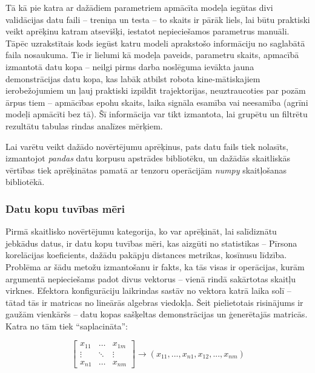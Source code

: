 \documentclass[12pt, a4paper]{article}
\numberwithin{equation}{section} %
\begin{document}
Tā kā pie katra ar dažādiem parametriem apmācīta modeļa iegūtas divi validācijas datu faili -- treniņa un testa -- to skaits ir pārāk liels, lai būtu praktiski veikt aprēķinu katram atsevišķi, iestatot nepieciešamos parametrus manuāli. Tāpēc uzrakstītais kods iegūst katru modeli aprakstošo informāciju no saglabātā faila nosaukuma. Tie ir lielumi kā modeļa paveids, parametru skaits, apmacībā izmantotā datu kopa -- neilgi pirms darba noslēguma ievākta jauna demonstrācijas datu kopa, kas labāk atbilst robota kine-mātiskajiem ierobežojumiem un ļauj praktiski izpildīt trajektorijas, neuztraucoties par pozām ārpus tiem -- apmācības epohu skaits, laika signāla esamība vai neesamība (agrīni modeļi apmācīti bez tā). Šī informācija var tikt izmantota, lai grupētu un filtrētu rezultātu tabulas rindas analīzes mērķiem.

Lai varētu veikt dažādo novērtējumu aprēķinus, pats datu fails tiek nolasīts, izmantojot \textit{pandas} datu korpusu apstrādes bibliotēku, un dažādās skaitliskās vērtības tiek aprēķinātas pamatā ar tenzoru operācijām \textit{numpy} skaitļošanas bibliotēkā.

\subsubsection{Datu kopu tuvības mēri}

Pirmā skaitlisko novērtējumu kategorija, ko var aprēķināt, lai salīdiznātu jebkādus datus, ir datu kopu tuvības mēri, kas aizgūti no statistikas -- Pīrsona korelācijas koeficients, dažādu pakāpju distances metrikas, kosīnusu līdzība. Problēma ar šādu metožu izmantošanu ir fakts, ka tās visas ir operācijas, kurām argumentā nepieciešams padot divus vektorus -- vienā rindā sakārtotas skaitļu virknes. Efektora konfigurāciju laikrindas sastāv no vektora katrā laika solī -- tātad tās ir matricas no lineārās algebras viedokļa. Šeit pielietotais risinājums ir gaužām vienkāršs -- datu kopas sašķeltas demonstrācijas un ģenerētajās matricās. Katra no tām tiek ``saplacināta'':

\begin{equation}
    \begin{bmatrix}
        x_{11} & \ldots & x_{1m} \\
        \vdots & \ddots & \vdots \\
        x_{n1} & \ldots & x_{nm}
    \end{bmatrix}
    \rightarrow
    (x_{11}, ..., x_{n1}, x_{12}, ..., x_{nm})
\end{equation}
\end{document}
